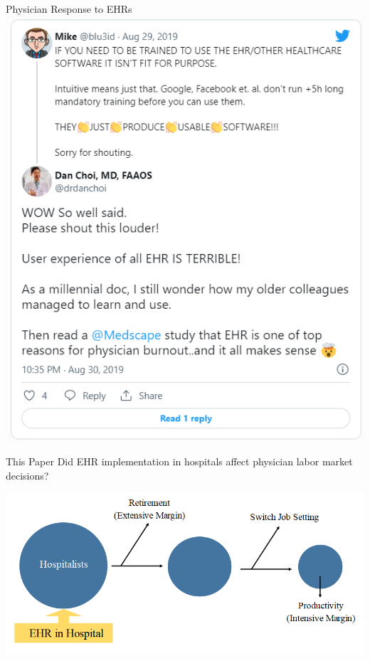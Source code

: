 \documentclass[10pt]{beamer}
\begin{document}
\begin{frame}{Physician Response to EHRs}
\centering
\includegraphics[scale=.4]{graphics/EHR tweet.PNG}
\end{frame}



\begin{frame}{This Paper}
Did EHR implementation in hospitals affect physician labor market decisions?
                \vspace{4mm}
\begin{center}
\includegraphics[scale=.4]{graphics/EHR_FlowChart_General.PNG}
\end{center}
\end{frame}
\end{document}
